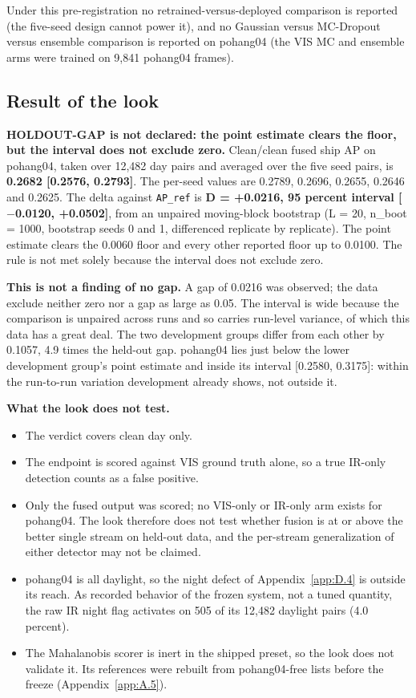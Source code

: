 \documentclass[journal,onecolumn]{IEEEtran}
\begin{document}
Under this pre-registration no retrained-versus-deployed comparison is reported (the five-seed design cannot power it), and no Gaussian versus MC-Dropout versus ensemble comparison is reported on pohang04 (the VIS MC and ensemble arms were trained on 9,841 pohang04 frames).

\subsection{Result of the look}\label{app:G.2}
\textbf{HOLDOUT-GAP is not declared: the point estimate clears the floor, but the interval does not exclude zero.} Clean/clean fused ship AP on pohang04, taken over 12,482 day pairs and averaged over the five seed pairs, is \textbf{0.2682 [0.2576, 0.2793]}. The per-seed values are 0.2789, 0.2696, 0.2655, 0.2646 and 0.2625. The delta against \texttt{AP\_\allowbreak{}ref} is \textbf{D = +0.0216, 95 percent interval [$-$0.0120, +0.0502]}, from an unpaired moving-block bootstrap (L = 20, n\_boot = 1000, bootstrap seeds 0 and 1, differenced replicate by replicate). The point estimate clears the 0.0060 floor and every other reported floor up to 0.0100. The rule is not met solely because the interval does not exclude zero.

\textbf{This is not a finding of no gap.} A gap of 0.0216 was observed; the data exclude neither zero nor a gap as large as 0.05. The interval is wide because the comparison is unpaired across runs and so carries run-level variance, of which this data has a great deal. The two development groups differ from each other by 0.1057, 4.9 times the held-out gap. pohang04 lies just below the lower development group's point estimate and inside its interval [0.2580, 0.3175]: within the run-to-run variation development already shows, not outside it.

\textbf{What the look does not test.}
\begin{itemize}
\item The verdict covers clean day only.
\item The endpoint is scored against VIS ground truth alone, so a true IR-only detection counts as a false positive.
\item Only the fused output was scored; no VIS-only or IR-only arm exists for pohang04. The look therefore does not test whether fusion is at or above the better single stream on held-out data, and the per-stream generalization of either detector may not be claimed.
\item pohang04 is all daylight, so the night defect of Appendix~\ref{app:D.4} is outside its reach. As recorded behavior of the frozen system, not a tuned quantity, the raw IR night flag activates on 505 of its 12,482 daylight pairs (4.0 percent).
\item The Mahalanobis scorer is inert in the shipped preset, so the look does not validate it. Its references were rebuilt from pohang04-free lists before the freeze (Appendix~\ref{app:A.5}).
\end{itemize}
\end{document}
